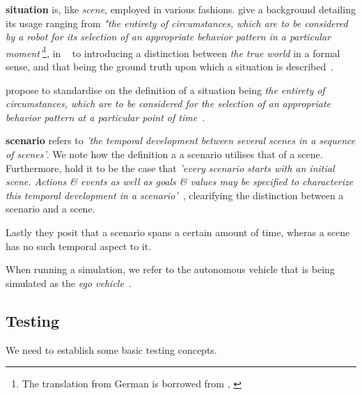\textbf{situation} is, like \textit{scene}, employed in various fashions. \citeauthor{scenes}
give a background detailing its usage ranging from \textit{"the entirety of circumstances,
    which are to be considered by a robot for its selection of an appropriate behavior pattern in a
    particular moment'}\footnote{The translation from German is borrowed from \citeauthor{scenes},
    \cite[984]{scenes}}, in  \citeauthor{scenarioTysk}~\cite[3]{scenarioTysk} to
\citeauthor{schmidtScenario} introducing a distinction between \textit{the true world} in a formal
sense, and that being the ground truth upon which a situation is
described~\cite[892]{schmidtScenario}.

\citeauthor{scenes} propose to standardise on the definition of a situation being \textit{
    the entirety of circumstances, which  are to be considered for the selection of an
    appropriate behavior pattern at a particular point of time}~\cite[985]{scenes}.

\textbf{scenario} refers to \textit{'the temporal development between several scenes in a sequence
    of scenes'}\cite[986]{scenes}. We note how the definition a a scenario utilises that of a scene.
Furthermore, \citeauthor{scenes} hold it to be the case that \textit{'every scenario starts with an
    initial scene. Actions \& events as well as goals \& values may be  specified to characterize
    this temporal development in a scenario'}~\cite[986]{scenes}, clearifying the distinction
between a scenario and a scene.

Lastly they posit that a scenario spans a certain amount of time, wheras a scene has no such
temporal aspect to it.


When running a simulation, we refer to the autonomous vehicle that is being
simulated as the \textit{ego vehicle}~\cite{egoDefinition}.




\subsection{Testing}

We need to establish some basic testing concepts.

